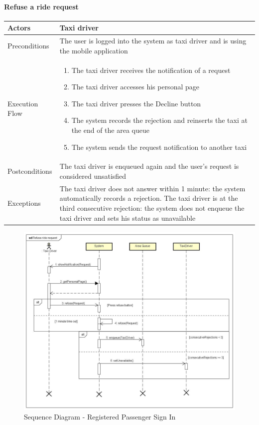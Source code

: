 \paragraph{Refuse a ride request}
\begin{center}
	\begin{tabular}{ | l | p{8cm} |}
		\hline Actors & Taxi driver
		\\ \hline
		Preconditions &
		The user is logged into the system as taxi driver and is using the mobile application
		\\ \hline
		Execution Flow &
		\begin{enumerate}
			\item The taxi driver receives the notification of a request
			\item The taxi driver accesses his personal page
			\item The taxi driver presses the Decline button
			\item The system records the rejection and reinserts the taxi at the end of
			the area queue
			\item The system sends the request notification to another taxi
		\end{enumerate}
		\\ \hline
		Postconditions & The taxi driver is enqueued again and the user's request
		is considered unsatisfied
		\\ \hline
		Exceptions &
		The taxi driver does not answer within 1 minute:
		the system automatically records a rejection.
		The taxi driver is at the third consecutive rejection:
		the system does not enqueue the taxi driver and sets his status as unavailable
		\\ \hline
	\end{tabular}
\end{center}
\newpage
\begin{landscape}
\begin{figure}[!h]
	\begin{center}			
		\includegraphics[height=\textheight]{../SE2_SD/RefuseRideRequest}
		\caption{Sequence Diagram - Registered Passenger Sign In}	
	\end{center}
\end{figure}
\end{landscape}
\newpage